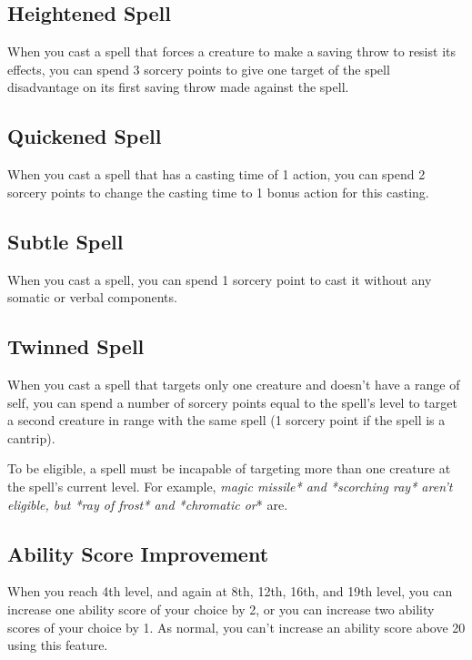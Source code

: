 \subsection{Heightened Spell}

When you cast a spell that forces a creature to make a saving throw to resist its effects, you can spend 3 sorcery points to give one target of the spell disadvantage on its first saving throw made against the spell.

\subsection{Quickened Spell}

When you cast a spell that has a casting time of 1 action, you can spend 2 sorcery points to change the casting time to 1 bonus action for this casting.

\subsection{Subtle Spell}

When you cast a spell, you can spend 1 sorcery point to cast it without any somatic or verbal components.

\subsection{Twinned Spell}

When you cast a spell that targets only one creature and doesn’t have a range of self, you can spend a number of sorcery points equal to the spell’s level to target a second creature in range with the same spell (1 sorcery point if the spell is a cantrip).

To be eligible, a spell must be incapable of targeting more than one creature at the spell’s current level. For example, \textit{magic missile* and *scorching ray* aren’t eligible, but *ray of frost* and *chromatic or}* are.

\subsection{Ability Score Improvement}

When you reach 4th level, and again at 8th, 12th, 16th, and 19th level, you can increase one ability score of your choice by 2, or you can increase two ability scores of your choice by 1. As normal, you can’t increase an ability score above 20 using this feature.

